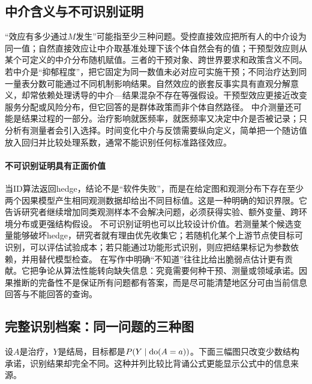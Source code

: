\subsection{中介含义与不可识别证明}

“效应有多少通过$M$发生”可能指至少三种问题。受控直接效应把所有人的中介设为同一值；自然直接效应让中介取基准处理下该个体自然会有的值；干预型效应则从某个可定义的中介分布随机赋值。三者的干预对象、跨世界要求和政策含义不同。
若中介是“抑郁程度”，把它固定为同一数值未必对应可实施干预；不同治疗达到同一量表分数可能通过不同机制影响结果。自然效应的嵌套反事实具有直观分解意义，却常依赖处理诱导的中介---结果混杂不存在等强假设。干预型效应更接近改变服务分配或风险分布，但它回答的是群体政策而非个体自然路径。
中介测量还可能是结果过程的一部分。治疗影响就医频率，就医频率又决定中介是否被记录；只分析有测量者会引入选择。时间变化中介与反馈需要纵向定义，简单把一个随访值放入回归并比较处理系数，通常不能识别任何标准路径效应。

\paragraph{不可识别证明具有正面价值}

当ID算法返回hedge，结论不是“软件失败”，而是在给定图和观测分布下存在至少两个因果模型产生相同观测数据却给出不同目标值。这是一种明确的知识界限。它告诉研究者继续增加同类观测样本不会解决问题，必须获得实验、额外变量、跨环境分布或更强结构假设。
不可识别证明也可以比较设计价值。若测量某个候选变量能够破坏hedge，研究者就有理由优先收集它；若随机化某个上游节点使目标可识别，可以评估试验成本；若只能通过功能形式识别，则应把结果标记为参数依赖，并用替代模型检查。
在写作中明确“不知道”往往比给出脆弱点估计更有贡献。它把争论从算法性能转向缺失信息：究竟需要何种干预、测量或领域承诺。因果推断的完备性不是保证所有问题都有答案，而是尽可能清楚地区分可由当前信息回答与不能回答的查询。

\subsection{完整识别档案：同一问题的三种图}

设$A$是治疗，$Y$是结局，目标都是$P(Y\mid\operatorname{do}(A=a))$。下面三幅图只改变少数结构承诺，识别结果却完全不同。这种并列比较比背诵公式更能显示公式中的信息来源。

